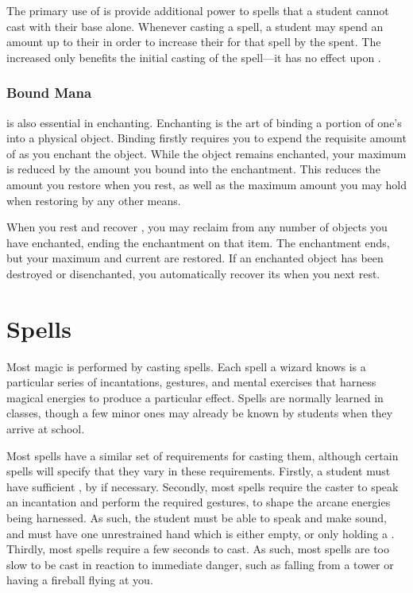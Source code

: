 The primary use of {\mana} is provide additional power to spells that a student cannot cast with their base {\focus} alone.
Whenever casting a spell, a student may spend an amount {\mana} up to their {\overchannel} in order to increase their {\focus} for that spell by the {\mana} spent.
The increased {\focus} only benefits the initial casting of the spell---it has no effect upon {\concentration}.

\subsubsection{Bound Mana}

\capital{\mana} is also essential in enchanting.
Enchanting is the art of binding a portion of one's {\mana} into a physical object.
Binding {\mana} firstly requires you to expend the requisite amount of {\mana} as you enchant the object.
While the object remains enchanted, your maximum {\mana} is reduced by the amount you bound into the enchantment.
This reduces the amount you restore when you rest, as well as the maximum amount you may hold when restoring {\mana} by any other means.

When you rest and recover {\mana}, you may reclaim {\mana} from any number of objects you have enchanted, ending the enchantment on that item.
The enchantment ends, but your maximum and current {\mana} are restored.
If an enchanted object has been destroyed or disenchanted, you automatically recover its {\mana} when you next rest.

\section{Spells}

Most magic is performed by casting spells.
Each spell a wizard knows is a particular series of incantations, gestures, and mental exercises that harness magical energies to produce a particular effect.
Spells are normally learned in classes, though a few minor ones may already be known by students when they arrive at school.

Most spells have a similar set of requirements for casting them, although certain spells will specify that they vary in these requirements.
Firstly, a student must have sufficient {\focus}, by {\overchannelling} if necessary.
Secondly, most spells require the caster to speak an incantation and perform the required gestures, to shape the arcane energies being harnessed.
As such, the student must be able to speak and make sound, and must have one unrestrained hand which is either empty, or only holding a {\castingtool}.
Thirdly, most spells require a few seconds to cast.
As such, most spells are too slow to be cast in reaction to immediate danger, such as falling from a tower or having a fireball flying at you.


